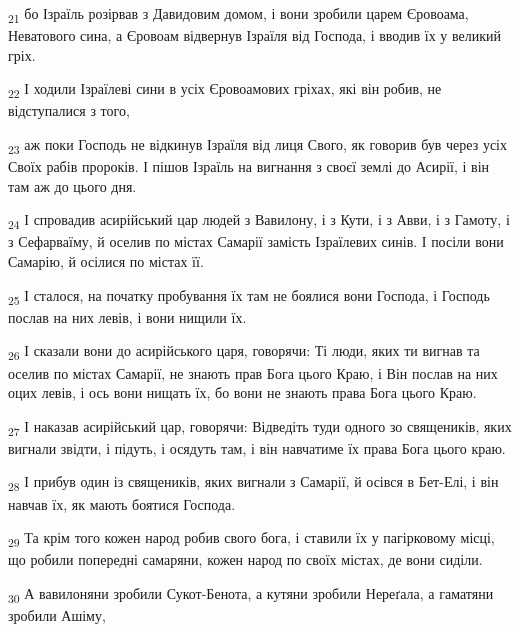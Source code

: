 \begin{tcolorbox}
\textsubscript{21} бо Ізраїль розірвав з Давидовим домом, і вони зробили царем Єровоама, Неватового сина, а Єровоам відвернув Ізраїля від Господа, і вводив їх у великий гріх.
\end{tcolorbox}
\begin{tcolorbox}
\textsubscript{22} І ходили Ізраїлеві сини в усіх Єровоамових гріхах, які він робив, не відступалися з того,
\end{tcolorbox}
\begin{tcolorbox}
\textsubscript{23} аж поки Господь не відкинув Ізраїля від лиця Свого, як говорив був через усіх Своїх рабів пророків. І пішов Ізраїль на вигнання з своєї землі до Асирії, і він там аж до цього дня.
\end{tcolorbox}
\begin{tcolorbox}
\textsubscript{24} І спровадив асирійський цар людей з Вавилону, і з Кути, і з Авви, і з Гамоту, і з Сефарваїму, й оселив по містах Самарії замість Ізраїлевих синів. І посіли вони Самарію, й осілися по містах її.
\end{tcolorbox}
\begin{tcolorbox}
\textsubscript{25} І сталося, на початку пробування їх там не боялися вони Господа, і Господь послав на них левів, і вони нищили їх.
\end{tcolorbox}
\begin{tcolorbox}
\textsubscript{26} І сказали вони до асирійського царя, говорячи: Ті люди, яких ти вигнав та оселив по містах Самарії, не знають прав Бога цього Краю, і Він послав на них оцих левів, і ось вони нищать їх, бо вони не знають права Бога цього Краю.
\end{tcolorbox}
\begin{tcolorbox}
\textsubscript{27} І наказав асирійський цар, говорячи: Відведіть туди одного зо священиків, яких вигнали звідти, і підуть, і осядуть там, і він навчатиме їх права Бога цього краю.
\end{tcolorbox}
\begin{tcolorbox}
\textsubscript{28} І прибув один із священиків, яких вигнали з Самарії, й осівся в Бет-Елі, і він навчав їх, як мають боятися Господа.
\end{tcolorbox}
\begin{tcolorbox}
\textsubscript{29} Та крім того кожен народ робив свого бога, і ставили їх у пагірковому місці, що робили попередні самаряни, кожен народ по своїх містах, де вони сиділи.
\end{tcolorbox}
\begin{tcolorbox}
\textsubscript{30} А вавилоняни зробили Сукот-Бенота, а кутяни зробили Нереґала, а гаматяни зробили Ашіму,
\end{tcolorbox}
